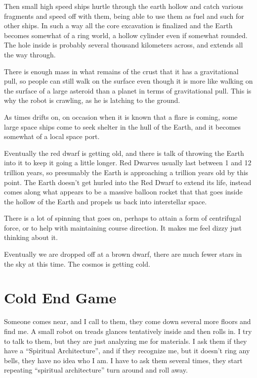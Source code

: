 Then small high speed ships hurtle through the earth hollow and catch various 
fragments and speed off with them, being able to use them as fuel and such for 
other ships. In such a way all the core excavation is finalized and the Earth
becomes somewhat of a ring world, a hollow cylinder even if somewhat rounded.
The hole inside is probably several thousand kilometers across, and extends all
the way through. 

There is enough mass in what remains of the crust that it has a gravitational
pull, so people can still walk on the surface even though it is more like 
walking on the surface of a large asteroid than a planet in terms of 
gravitational pull.  This is why the robot is crawling, as he is latching to 
the ground. 

As times drifts on, on occasion when it is known that a flare is coming, some
large space ships come to seek shelter in the hull of the Earth, and it becomes
somewhat of a local space port. 

Eventually the red dwarf is getting old, and there is talk of throwing the Earth
into it to keep it going a little longer. Red Dwarves usually last between 1 and
12 trillion years, so presumably the Earth is approaching a trillion years old
by this point. The Earth doesn't get hurled into the Red Dwarf to extend its
life, instead comes along what appears to be a massive balloon rocket that that 
goes inside the hollow of the Earth and propels us back into interstellar space. 

There is a lot of spinning that goes on, perhaps to attain a form of centrifugal
force, or to help with maintaining course direction. It makes me feel
dizzy just thinking about it. 

Eventually we are dropped off at a brown dwarf, there are much fewer stars in
the sky at this time. The cosmos is getting cold. 

\section{Cold End Game}

Someone comes near, and I call to them, they come down several more floors and
find me. A small robot on treads glances tentatively inside and then rolls in.
I try to talk to them, but they are just analyzing me for materials. I
ask them if they have a ``Spiritual Architecture'', and if they recognize me,
but it doesn't ring any bells, they have no idea who I am. I have to ask them 
several times, they start repeating ``spiritual architecture'' turn around and
roll away. 

